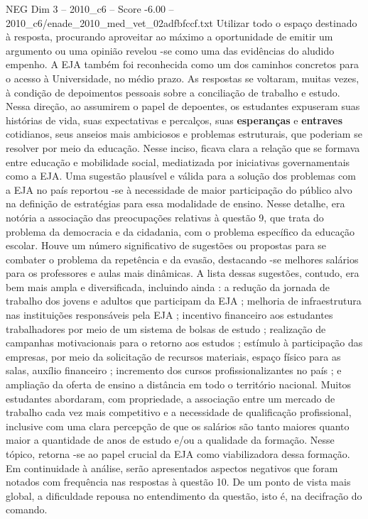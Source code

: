 \begin{textsample}{NEG Dim 3 – 2010\_c6 – Score -6.00 – 2010\_c6/enade\_2010\_med\_vet\_02adfbfccf.txt}
Utilizar todo o espaço destinado à resposta, procurando aproveitar ao máximo a oportunidade de emitir um argumento ou uma opinião revelou -se como uma das evidências do aludido empenho.
A EJA também foi reconhecida como um dos caminhos concretos para o acesso à Universidade, no médio prazo.
As respostas se voltaram, muitas vezes, à condição de depoimentos pessoais sobre a conciliação de trabalho e estudo.
Nessa direção, ao assumirem o papel de depoentes, os estudantes expuseram suas histórias de vida, suas expectativas e percalços, suas \textbf{esperanças} e \textbf{entraves} cotidianos, seus anseios mais ambiciosos e problemas estruturais, que poderiam se resolver por meio da educação.
Nesse inciso, ficava clara a relação que se formava entre educação e mobilidade social, mediatizada por iniciativas governamentais como a EJA.
Uma sugestão plausível e válida para a solução dos problemas com a EJA no país reportou -se à necessidade de maior participação do público alvo na definição de estratégias para essa modalidade de ensino.
Nesse detalhe, era notória a associação das preocupações relativas à questão 9, que trata do problema da democracia e da cidadania, com o problema específico da educação escolar.
Houve um número significativo de sugestões ou propostas para se combater o problema da repetência e da evasão, destacando -se melhores salários para os professores e aulas mais dinâmicas.
A lista dessas sugestões, contudo, era bem mais ampla e diversificada, incluindo ainda : a redução da jornada de trabalho dos jovens e adultos que participam da EJA ; melhoria de infraestrutura nas instituições responsáveis pela EJA ; incentivo financeiro aos estudantes trabalhadores por meio de um sistema de bolsas de estudo ; realização de campanhas motivacionais para o retorno aos estudos ; estímulo à participação das empresas, por meio da solicitação de recursos materiais, espaço físico para as salas, auxílio financeiro ; incremento dos cursos profissionalizantes no país ; e ampliação da oferta de ensino a distância em todo o território nacional.
Muitos estudantes abordaram, com propriedade, a associação entre um mercado de trabalho cada vez mais competitivo e a necessidade de qualificação profissional, inclusive com uma clara percepção de que os salários são tanto maiores quanto maior a quantidade de anos de estudo e/ou a qualidade da formação.
Nesse tópico, retorna -se ao papel crucial da EJA como viabilizadora dessa formação.
Em continuidade à análise, serão apresentados aspectos negativos que foram notados com frequência nas respostas à questão 10.
De um ponto de vista mais global, a dificuldade repousa no entendimento da questão, isto é, na decifração do comando.

\end{textsample}
